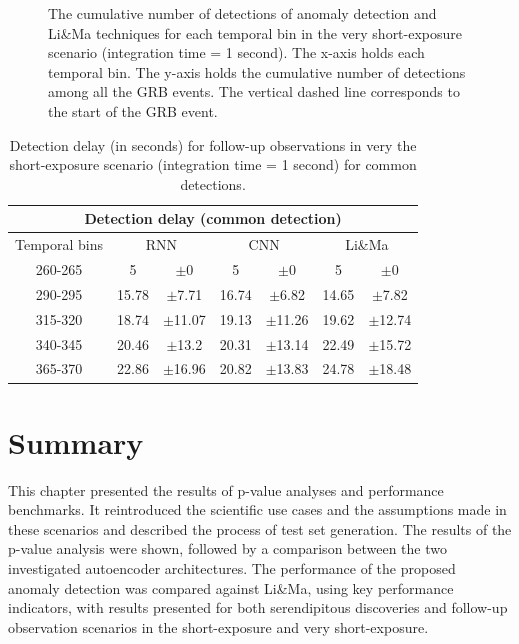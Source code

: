 \begin{figure}[!ht]
\centering

\captionsetup{width=1\linewidth}
\caption{The cumulative number of detections of anomaly detection and Li\&Ma techniques for each temporal bin in the very short-exposure scenario (integration time = 1 second). The x-axis holds each temporal bin. The y-axis holds the cumulative number of detections among all the GRB events. The vertical dashed line corresponds to the start of the GRB event.}
\label{fig:follow-up-itime-1}
\end{figure}


\begin{table}[!ht]
\centering
\begin{tabular}{|c|cc|cc|cc|} 
\hline
\multicolumn{7}{|c|}{\textbf{Detection delay} (common detection)} \\ 
\hline
\multicolumn{1}{|c|}{Temporal bins} & \multicolumn{2}{c|}{RNN} & \multicolumn{2}{c|}{CNN} & \multicolumn{2}{c|}{Li\&Ma} \\ 
\hline
260-265 & 5 &  $\pm$0 & 5 &  $\pm$0 & 5 &  $\pm$0 \\
290-295&15.78&$\pm$7.71&16.74&$\pm$6.82&14.65&$\pm$7.82\\
315-320&18.74&$\pm$11.07&19.13&$\pm$11.26&19.62&$\pm$12.74\\
340-345&20.46&$\pm$13.2&20.31&$\pm$13.14&22.49&$\pm$15.72\\
365-370&22.86&$\pm$16.96&20.82&$\pm$13.83&24.78&$\pm$18.48\\
\hline
\end{tabular}
\caption{Detection delay (in seconds) for follow-up observations in very the short-exposure scenario (integration time = 1 second) for common detections.}
\label{tab:dd-follow-up-itime-1-common}
\end{table}

\FloatBarrier
\section{Summary}
This chapter presented the results of p-value analyses and performance benchmarks. It reintroduced the scientific use cases and the assumptions made in these scenarios and described the process of test set generation. The results of the p-value analysis were shown, followed by a comparison between the two investigated autoencoder architectures. The performance of the proposed anomaly detection was compared against Li\&Ma, using key performance indicators, with results presented for both serendipitous discoveries and follow-up observation scenarios in the short-exposure and very short-exposure.